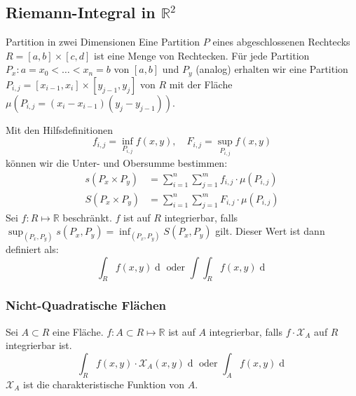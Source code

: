 \documentclass[a4paper,10pt]{article}
\def\R{\mathbb{R}}
\def\X{\mathcal{X}}
\begin{document}
\subsection{Riemann-Integral in \texorpdfstring{\(\R^2\)}{R²}}
\begin{subbox}{Partition in zwei Dimensionen}
  Eine Partition \(P\) eines abgeschlossenen Rechtecks \(R = \left[a,b\right] \times \left[c,d\right]\) ist eine Menge von Rechtecken. Für jede Partition \(P_x : a = x_0 < \ldots < x_n = b\) von \(\left[a,b\right]\) und \(P_y\) (analog) erhalten wir eine Partition \(P_{i,j} = \left[x_{i-1}, x_i\right] \times \left[y_{j-1},y_j\right]\) von \(R\) mit der Fläche \(\mu({P_{i,j}} = (x_i - x_{i-1})(y_j - y_{j-1}))\).
\end{subbox}
Mit den Hilfsdefinitionen
\[f_{i,j} = \inf_{P_{i,j}} f(x,y), \quad F_{i,j} = \sup_{P_{i,j}} f(x,y)\]
können wir die Unter- und Obersumme bestimmen:
\begin{align*}
  s(P_x \times P_y) &= \sum_{i=1}^n \sum_{j=1}^m f_{i,j} \cdot \mu(P_{i,j}) \\
  S(P_x \times P_y) &= \sum_{i=1}^n \sum_{j=1}^m F_{i,j} \cdot \mu(P_{i,j})
\end{align*}
Sei \(f: R \mapsto \R\) beschränkt. \(f\) ist auf \(R\) integrierbar, falls \(\sup_{(P_x, P_y)} s(P_x, P_y) = \inf_{(P_x, P_y)} S(P_x, P_y)\) gilt. Dieser Wert ist dann definiert als:
\[\int_R f(x,y) \mathop{d(x,y)} \text{ oder } \int\int_R f(x,y) \mathop{d(x,y)}\]

\subsubsection*{Nicht-Quadratische Flächen}
Sei \(A \subset R\) eine Fläche. \(f : A \subset R \mapsto \R\) ist auf \(A\) integrierbar, falls \(f \cdot \X_A\) auf \(R\) integrierbar ist. 
\[\int_R f(x,y) \cdot \X_A(x,y) \mathop{d(x,y)} \text{ oder } \int_A f(x,y) \mathop{d(x,y)}\]
\(\X_A\) ist die charakteristische Funktion von \(A\).
\end{document}
